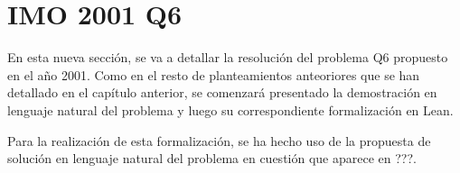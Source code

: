 \section{IMO 2001 Q6}

En esta nueva sección, se va a detallar la resolución del problema Q6
propuesto en el año 2001. Como en el resto de planteamientos anteoriores
que se han detallado en el capítulo anterior, se comenzará presentado la
demostración en lenguaje natural del problema y luego su correspondiente
formalización en Lean.

Para la realización de esta formalización, se ha hecho uso de la propuesta de
solución en lenguaje natural del problema en cuestión que aparece en ???.

\noindent
{}


